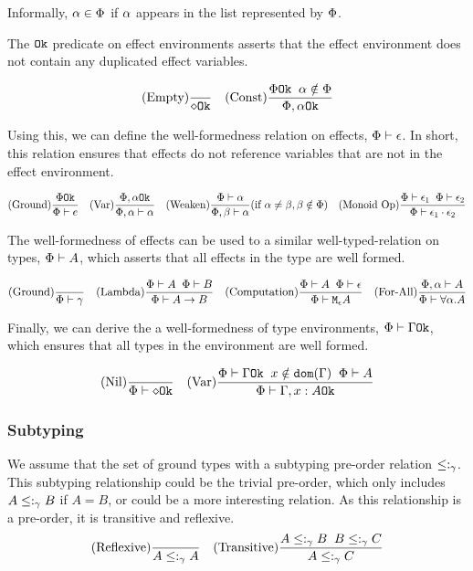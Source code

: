 \documentclass{Report}
\begin{document}
Informally, $\a \in \P$ if $\a$ appears in the list represented by $\P$.

The $\ok{}$ predicate on effect environments asserts that the effect environment does not contain any duplicated effect variables.

\[
    \treerule{Empty}{}{\ok{\nil}}
\quad
    \treerule{Const}{\ok{\P} \s\s \a\notin \P}{\ok{\P, \a}}
\]

Using this, we can define the well-formedness relation on effects, $\wellformed{\P}{\e}$. In short, this relation ensures that effects do not reference variables that are not in the effect environment.

\[
    \treerule{Ground}{\ok{\P}}{\wellformed{\P}{e}}
    \quad
    \treerule{Var}{\ok{\P,\a}}{\wellformed{\P,\a}{\a}}
    \quad
    \condtreerule{Weaken}{\wellformed{\P}{\a}}{\wellformed{\P,\b}{\a}}{\a\neq\b, \b\notin\P}
    \quad
    \treerule{Monoid Op}{\wellformed{\P}{\e_1}\s\s\wellformed{\P}{\e_2}}{\wellformed{\P}{\e_1\dot\e_2}}
\]

The well-formedness of effects can be used to a similar well-typed-relation on types, $\wellformed{\P}{A}$, which asserts that all effects in the type are well formed.

\[
    \treerule{Ground}{}{\wellformed{\P}{\g}}
    \quad
    \treerule{Lambda}{\wellformed{\P}{A}\s\s\wellformed{\P}{B}}{\wellformed{\P}{\ab}}
    \quad
    \treerule{Computation}{\wellformed{\P}{A}\s\s\wellformed{\P}{\e}}{\wellformed{\P}{\mea}}
    \quad
    \treerule{For-All}{\wellformed{\P,\a}{A}}{\wellformed{\P}{\all{\a}{A}}}
\]

Finally, we can derive the a well-formedness of type environments,   $\oke{\P}{\G}$, which ensures that all types in the environment are well formed.

\[
    \treerule{Nil}{}{\oke{\P}{\nil}}
    \quad
    \treerule{Var}{\oke{\P}{\G}\s\s x\notin\dom{\G}\s\s \wellformed{\P}{A}}{\oke{\P}{\gax}}
\]

\subsubsection{Subtyping}

We assume that the set of ground types with a subtyping pre-order relation $\subtype_{\ground}$. This subtyping relationship could be the trivial pre-order, which only includes $A\subtypeg B$ if $A = B$, or could be a more interesting relation. As this relationship is a pre-order, it is transitive and reflexive.
    \[
        \treerule{Reflexive}{}{A \subtype_{\ground} A}
        \quad
        \treerule{Transitive}{A \subtype_{\ground} B \s \s B \subtype_{\ground} C}{A \subtype_{\ground} C}
    \]
\end{document}
